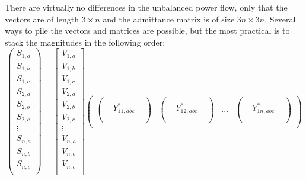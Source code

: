 \documentclass[11pt]{article}
\begin{document}
	There are virtually no differences in the unbalanced power flow, only that the vectors are of length $3\times n$ and the admittance matrix is of size $3n \times 3n$. Several ways to pile the vectors and matrices are possible, but the most practical is to stack the magnitudes in the following order: 
	\begin{equation}
		\begin{pmatrix}
			S_{1,a} \\
			S_{1,b} \\
			S_{1,c} \\
			S_{2,a} \\
			S_{2,b} \\
			S_{2,c} \\
			\vdots \\
			S_{n,a} \\
			S_{n,b} \\
			S_{n,c} \\
		\end{pmatrix} = 
		\begin{bmatrix}
			V_{1,a} \\
			V_{1,b} \\
			V_{1,c} \\
			V_{2,a} \\
			V_{2,b} \\
			V_{2,c} \\
			\vdots \\
			V_{n,a} \\
			V_{n,b} \\
			V_{n,c} \\
		\end{bmatrix}
		\begin{pmatrix}
			\begin{pmatrix}
				 &  &  \\
				 & Y_{11,abc}^* &  \\
				 &  &  \\
			\end{pmatrix} &
			\begin{pmatrix}
				 &  &  \\
				 & Y_{12,abc}^* &  \\
				 &  &  \\
			\end{pmatrix} &
			...	&
			\begin{pmatrix}
				 &  &  \\
				 & Y_{1n,abc}^* &  \\
				 &  &  \\
			\end{pmatrix} \\

\end{pmatrix}
\end{equation}
\end{document}
